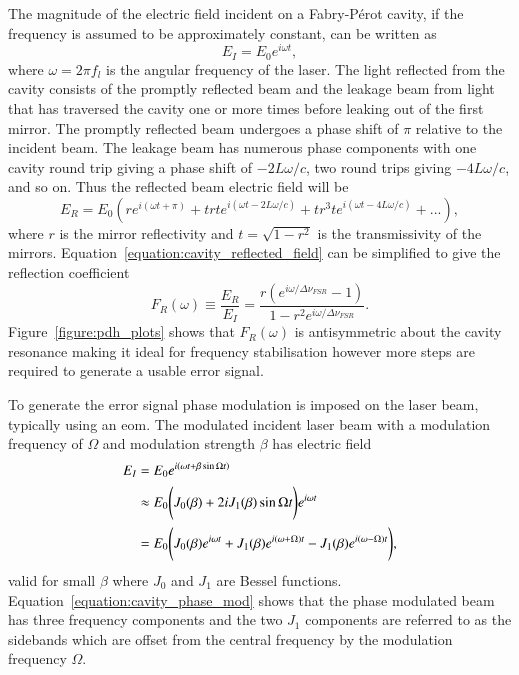 The magnitude of the electric field incident on a Fabry-P\'erot cavity, if the frequency is assumed to be approximately constant, can be written as
\begin{equation}
E_{I} = E_0 e^{i\omega t},
\end{equation}
where $\omega=2\pi f_l$ is the angular frequency of the laser.
The light reflected from the cavity consists of the promptly reflected beam and the leakage beam from light that has traversed the cavity one or more times before leaking out of the first mirror.
The promptly reflected beam undergoes a phase shift of $\pi$ relative to the incident beam.
The leakage beam has numerous phase components with one cavity round trip giving a phase shift of $-2L\omega/c$, two round trips giving $-4L\omega/c$, and so on.
Thus the reflected beam electric field will be
\begin{equation}\label{equation:cavity_reflected_field}
E_R = E_0 \left( r e^{i\left(\omega t + \pi\right)} + t r t e^{i\left(\omega t -2L\omega/c\right)} + t r^3 t e^{i\left(\omega t -4L\omega/c\right)} + ...\right),
\end{equation}
where $r$ is the mirror reflectivity and $t=\sqrt{1-r^2}$ is the transmissivity of the mirrors.
Equation~\ref{equation:cavity_reflected_field} can be simplified to give the reflection coefficient
\begin{equation}\label{equation:reflection_coefficient}
F_R(\omega) \equiv \frac{E_R}{E_I} = \frac{r\left(e^{i\omega / \Delta\nu_{FSR}} - 1 \right)}{1-r^2 e^{i\omega / \Delta\nu_{FSR}}}.
\end{equation}
Figure~\ref{figure:pdh_plots} shows that $F_R(\omega)$ is antisymmetric about the cavity resonance making it ideal for frequency stabilisation however more steps are required to generate a usable error signal.

To generate the error signal phase modulation is imposed on the laser beam, typically using an \gls{eom}.
The modulated incident laser beam with a modulation frequency of $\Omega$ and modulation strength $\beta$ has electric field
\begin{align}
E_I &= E_0 e^{i\left(\omega t + \beta \sin\Omega t \right)} \notag \\
&\approx E_0 \Bigg( J_0(\beta) + 2iJ_1(\beta)\sin\Omega t \Bigg)e^{i\omega t} \notag \\
&= E_0 \Bigg( J_0(\beta)e^{i\omega t} + J_1(\beta)e^{i(\omega + \Omega)t} - J_1(\beta)e^{i(\omega - \Omega)t} \Bigg),\label{equation:cavity_phase_mod}
\end{align}
valid for small $\beta$ where $J_0$ and $J_1$ are Bessel functions.
Equation~\ref{equation:cavity_phase_mod} shows that the phase modulated beam has three frequency components and the two $J_1$ components are referred to as the sidebands which are offset from the central frequency by the modulation frequency $\Omega$.

